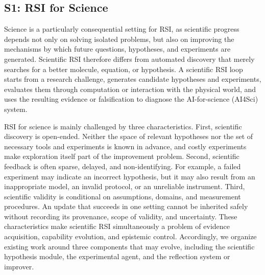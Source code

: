 



\subsection{S1: RSI for Science}
\label{subsec:s1}

Science is a particularly consequential setting for RSI, as scientific progress depends not only on solving isolated problems, but also on improving the mechanisms by which future questions, hypotheses, and experiments are generated. 
Scientific RSI therefore differs from automated discovery that merely searches for a better molecule, equation, or hypothesis. A scientific RSI loop starts from a research challenge, generates candidate hypotheses and experiments, evaluates them through computation or interaction with the physical world, and uses the resulting evidence or falsification to diagnose the AI-for-science (AI4Sci) system. 

RSI for science is mainly challenged by three characteristics. 
First, scientific discovery is open-ended. Neither the space of relevant hypotheses nor the set of necessary tools and experiments is known in advance, and costly experiments make exploration itself part of the improvement problem. 
Second, scientific feedback is often sparse, delayed, and non-identifying. For example, a failed experiment may indicate an incorrect hypothesis, but it may also result from an inappropriate model, an invalid protocol, or an unreliable instrument. 
Third, scientific validity is conditional on assumptions, domains, and measurement procedures. An update that succeeds in one setting cannot be inherited safely without recording its provenance, scope of validity, and uncertainty. 
These characteristics make scientific RSI simultaneously a problem of evidence acquisition, capability evolution, and epistemic control. Accordingly, we organize existing work around three components that may evolve, including the scientific hypothesis module, the experimental agent, and the reflection system or improver.


